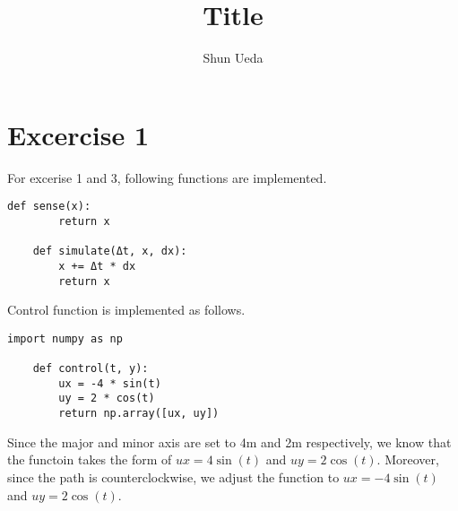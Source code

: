 \documentclass[letterpaper, 10 pt, conference]{ieeeconf}  %
\title{\LARGE \bf Title}
\author{Shun Ueda}
\begin{document}
    \maketitle
    \thispagestyle{empty}
    \pagestyle{empty}


    \section{Excercise 1}
    For excerise 1 and 3, following functions are implemented.

    \begin{lstlisting}[label={lst:lstlisting}]
    def sense(x):
        return x

    def simulate(Δt, x, dx):
        x += Δt * dx
        return x
    \end{lstlisting}

    Control function is implemented as follows.

    \begin{lstlisting}[label={lst:lstlisting1}]
    import numpy as np

    def control(t, y):
        ux = -4 * sin(t)
        uy = 2 * cos(t)
        return np.array([ux, uy])
    \end{lstlisting}

    Since the major and minor axis are set to 4m and 2m respectively, we know that the functoin takes the form of $ux = 4 \sin(t)$ and $uy = 2 \cos(t)$.
    Moreover, since the path is counterclockwise, we adjust the function to $ux = -4 \sin(t)$ and $uy = 2 \cos(t)$.


\end{document}
